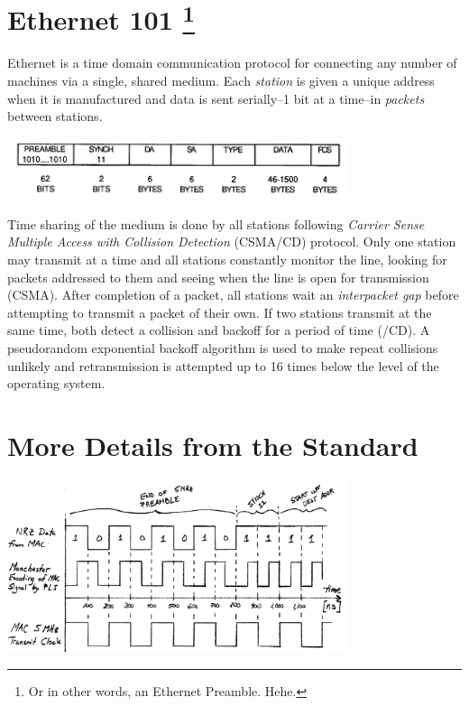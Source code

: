 \documentclass{article}
\begin{document}
\section[title]{Ethernet 101 \footnote{Or in other words, an Ethernet Preamble. Hehe.}}

Ethernet is a time domain communication protocol for connecting any number of
machines via a single, shared medium.
Each \textit{station} is given a unique address when it is manufactured and
data is sent serially--1 bit at a time--in \textit{packets} between
stations.

\begin{center}
	\includegraphics[width=0.75\textwidth]{ethernet-packet.pdf}
	\label{packet-format}
\end{center}

Time sharing of the medium is done by all stations following
\textit{Carrier Sense Multiple Access with Collision Detection}
(CSMA/CD) protocol.
Only one station may transmit at a time and all stations constantly
monitor the line, looking for packets addressed to them and seeing when
the line is open for transmission (CSMA).
After completion of a packet, all stations wait an
\textit{interpacket gap} before attempting to transmit a packet of their own.
If two stations transmit at the same time, both detect a collision
and backoff for a period of time (/CD).
A pseudorandom exponential backoff algorithm is used to make repeat
collisions unlikely and retransmission is attempted up to 16 times
below the level of the operating system.

\section{More Details from the Standard}

\begin{center}
	\includegraphics[width=0.75\textwidth]{timing-diagram.pdf}
	\label{timing-diagram}
\end{center}
\end{document}
